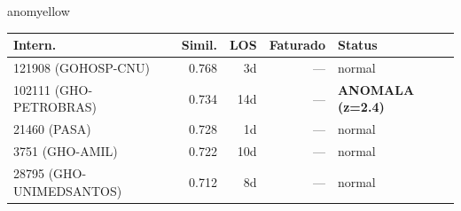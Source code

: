 \documentclass[a4paper,10pt]{article}
\begin{document}
\begin{anomalycard}[Internacao 166154 | GHO-PETROBRAS | MODERADO (z=2.35)]{anomyellow}
\begin{tabular}{l r r r l}\toprule\textbf{Intern.} & \textbf{Simil.} & \textbf{LOS} & \textbf{Faturado} & \textbf{Status} \\\midrule
121908 (GOHOSP-CNU) & 0.768 & 3d & --- & \textcolor{jcubeblue}{normal} \\
102111 (GHO-PETROBRAS) & 0.734 & 14d & --- & \textcolor{anomred}{\textbf{ANOMALA (z=2.4)}} \\
21460 (PASA) & 0.728 & 1d & --- & \textcolor{jcubeblue}{normal} \\
3751 (GHO-AMIL) & 0.722 & 10d & --- & \textcolor{jcubeblue}{normal} \\
28795 (GHO-UNIMEDSANTOS) & 0.712 & 8d & --- & \textcolor{jcubeblue}{normal} \\
\bottomrule\end{tabular}


\end{anomalycard}

\newpage
\end{document}
